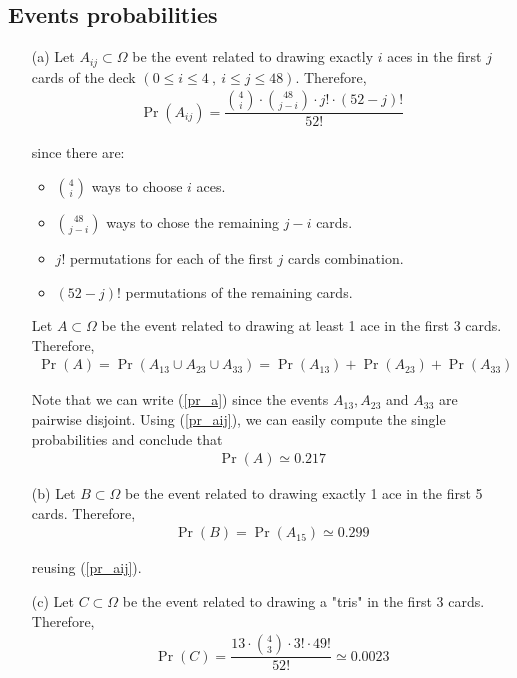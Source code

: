 \subsection{Events probabilities}
\begin{itemize}
	\item[(a)] Let $A_{ij} \subset \Omega$ be the event related to drawing exactly $i$ aces in the first $j$ cards of the deck $(0 \leq i \leq 4 \ , \ i \leq j \leq 48)$. Therefore,
	\begin{align}
		\Pr(A_{ij}) = \dfrac{\binom{4}{i} \cdot \binom{48}{j-i} \cdot j! \cdot (52-j)!}{52!} \label{pr_aij}
	\end{align}
	
	\newpage
	since there are:
	\begin{itemize}
		\item $\binom{4}{i}$ ways to choose $i$ aces.
		\item $\binom{48}{j-i}$ ways to chose the remaining $j-i$ cards.
		\item $j!$ permutations for each of the first $j$ cards combination.
		\item $(52-j)!$ permutations of the remaining cards.
	\end{itemize}
	
	Let $A \subset \Omega$ be the event related to drawing at least 1 ace in the first 3 cards. Therefore,
	\begin{align}
		\Pr(A) = \Pr(A_{13} \cup A_{23} \cup A_{33}) = \Pr(A_{13}) + \Pr(A_{23}) + \Pr(A_{33}) \label{pr_a}
	\end{align}
	
	Note that we can write (\ref{pr_a}) since the events $A_{13}, A_{23}$ and $A_{33}$ are pairwise disjoint. Using (\ref{pr_aij}), we can easily compute the single probabilities and conclude that
	\begin{align*}
		\Pr(A) \simeq 0.217
	\end{align*}
	
	\item[(b)] Let $B \subset \Omega$ be the event related to drawing exactly 1 ace in the first 5 cards. Therefore,
	\begin{align*}
		\Pr(B) = \Pr(A_{15}) \simeq 0.299
	\end{align*}
	
	reusing (\ref{pr_aij}).
	
	\item[(c)] Let $C \subset \Omega$ be the event related to drawing a "tris" in the first 3 cards. Therefore,
	\begin{align*}
		\Pr(C) = \dfrac{13 \cdot \binom{4}{3} \cdot 3! \cdot 49!}{52!} \simeq 0.0023
	\end{align*}
	

\end{itemize}
